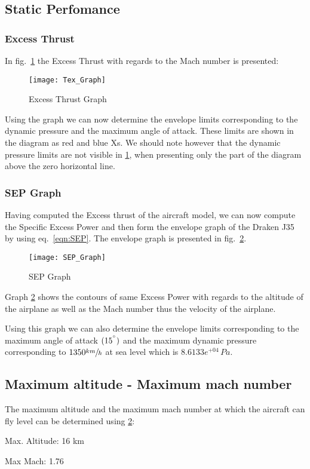 \subsection{Static Perfomance}

\subsubsection{Excess Thrust}

In fig.~\ref{fig:Tex_Graph} the Excess Thrust with regards to the Mach number is presented:

\begin{figure}[H]
    \centering
    \texttt{[image: Tex\_Graph]}
    \caption{Excess Thrust Graph}
    \label{fig:Tex_Graph}
\end{figure}

Using the graph we can now determine the envelope limits corresponding to the dynamic pressure and the 
maximum angle of attack. These limits are shown in the diagram as red and blue Xs.
We should note however that the dynamic pressure limits are not visible in  \ref{fig:Tex_Graph}, when presenting 
only the part of the diagram above the zero horizontal line.

\subsubsection{SEP Graph}

\noindent Having computed the Excess thrust of the aircraft model, we can now 
compute the Specific Excess Power and then form the envelope graph of the Draken J35 by using
eq.~\ref{eqn:SEP}. The envelope graph is presented in fig.~\ref{fig:SEP_Graph}.

\begin{figure}[H]
    \centering
    \texttt{[image: SEP\_Graph]}
    \caption{SEP Graph}
    \label{fig:SEP_Graph}
\end{figure}

\noindent Graph \ref{fig:SEP_Graph} shows the contours of same Excess Power with regards to
the altitude of the airplane as well as the Mach number thus the velocity of the airplane.

Using this graph we can also determine the envelope limits corresponding to the maximum angle of attack
$(15^{\degree})$ and the maximum dynamic pressure corresponding to $1350 \sfrac{km}{h}$ at sea level which 
is $8.6133e^{+04}\, Pa$.

\subsection{Maximum altitude - Maximum mach number}
The maximum altitude and the maximum mach number at which the aircraft can fly level 
can be determined using \ref{fig:SEP_Graph}:

\begin{itemize*}
    \item Max. Altitude: 16 km
    \item Max Mach: 1.76
\end{itemize*}
